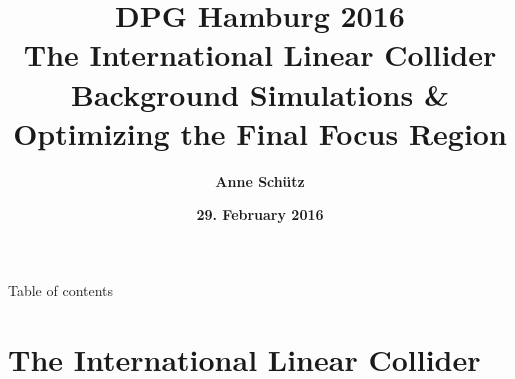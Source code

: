 \documentclass[xcolor={dvipsnames}]{beamer}
\title[ILC \& Background Simulations]{\textbf{\alert{DPG Hamburg 2016} \\\LARGE The International Linear Collider \\ \small Background Simulations \& Optimizing the Final Focus Region}}
\author{\textbf{Anne Sch\"utz}}
\institute{\textbf{KIT, DESY}}
\date{\textbf{29. February 2016}}
\begin{document}
{
\begin{frame}
  \titlepage
\end{frame}
}

\begin{frame}{Table of contents}
  \tableofcontents
\end{frame}


\section{The International Linear Collider}
\end{document}

